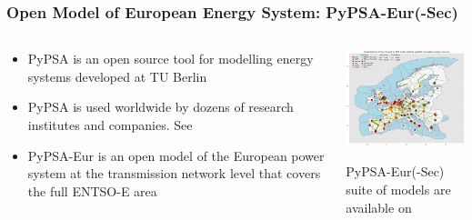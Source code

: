 \begin{frame}
  \frametitle{Open Model of European Energy System: PyPSA-Eur(-Sec)}

\begin{columns}[T]
\begin{column}{6cm}

  \begin{itemize}

  \item PyPSA is an \alert{open source} tool for modelling energy systems developed at TU Berlin
  \item PyPSA is used worldwide by \alert{dozens of research institutes and companies}. See 
  \item PyPSA-Eur is an open model of the European power system at the transmission network level that covers the \alert{full ENTSO-E area}
  \end{itemize}

\end{column}

\begin{column}{8cm}

\centering
\includegraphics[width=8cm]{images/elec_s_100.png}

 \vspace{0.1cm}

 PyPSA-Eur(-Sec) suite of models are available on 

\end{column}
\end{columns}

\end{frame}


